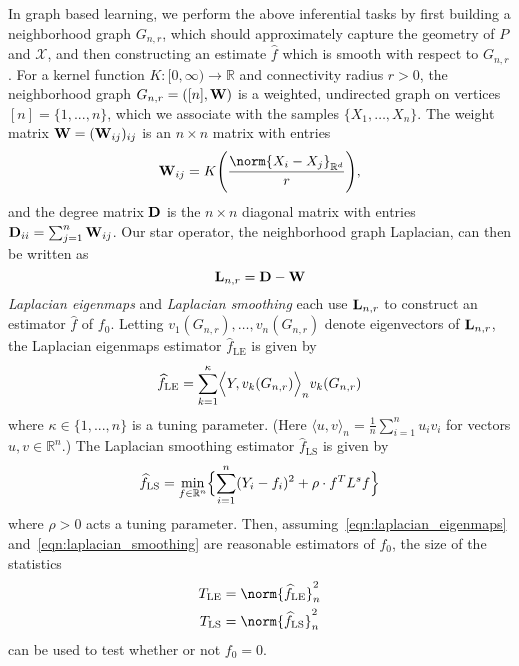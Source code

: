 \documentclass{article}
\newcommand{\Reals}{\mathbb{R}}
\newcommand{\1}{\mathbf{1}}
\newcommand{\Rd}{\Reals^d}
\newcommand{\Lap}{{\bf L}}
\newcommand{\mc}[1]{\mathcal{#1}}
\newcommand{\dotp}[2]{\langle #1, #2 \rangle}
\newcommand{\Dotp}[2]{\Bigl\langle #1, #2 \Bigr\rangle}
\newcommand{\wh}[1]{\widehat{#1}}
\newcommand{\LE}{\mathrm{LE}}
\newcommand{\LS}{\mathrm{LS}}
\theoremstyle{alden}
\theoremstyle{aldenthm}
\theoremstyle{definition}
\theoremstyle{remark}
\begin{document}
In graph based learning, we perform the above inferential tasks by first building a neighborhood graph $G_{n,r}$, which should approximately capture the geometry of $P$ and $\mc{X}$, and then constructing an estimate $\wh{f}$ which is smooth with respect to $G_{n,r}$. For a kernel function $K: [0,\infty) \to \Reals$ and connectivity radius $r > 0$, the neighborhood graph $G_{n,r} = ([n],{\bf W})$ is a weighted, undirected graph on vertices $[n] = \{1,...,n\}$, which we associate with the samples $\{X_1,\ldots,X_n\}$. The weight matrix ${\bf W} = ({\bf W}_{ij})_{ij}$ is an $n \times n$ matrix with entries
\begin{equation*}
\label{eqn:neighborhood_graph}
{\bf W}_{ij} = K\Biggl(\frac{\norm{X_i - X_j}_{\Rd}}{r}\Biggr),
\end{equation*}
and the degree matrix ${\bf D}$ is the $n \times n$ diagonal matrix with entries ${\bf D}_{ii} = \sum_{j = 1}^{n}{\bf W}_{ij}$.  Our star operator, the neighborhood graph Laplacian, can then be written as
\begin{equation}
\label{eqn:graph_Laplacian}
\Lap_{n,r} = \bf{D} - \bf{W}
\end{equation}
\emph{Laplacian eigenmaps} and \emph{Laplacian smoothing} each use $\Lap_{n,r}$ to construct an estimator $\wh{f}$ of $f_0$. Letting $v_1(G_{n,r}),\ldots,v_n(G_{n,r})$ denote eigenvectors of $\Lap_{n,r}$, the Laplacian eigenmaps estimator $\wh{f}_{\LE}$ \citep{belkin2003} is given by 
\begin{equation}
\label{eqn:laplacian_eigenmaps}
\wh{f}_{\textrm{LE}} = \sum_{k = 1}^{\kappa} \Dotp{Y}{v_k(G_{n,r})}_n v_{k}(G_{n,r})
\end{equation}
where $\kappa \in \{1,...,n\}$ is a tuning parameter. (Here $\dotp{u}{v}_n = \frac{1}{n}\sum_{i = 1}^{n} u_i v_i$ for vectors $u,v \in \Reals^n$.) The Laplacian smoothing estimator $\wh{f}_{\LS}$ \citep{smola2003} is given by
\begin{equation}
\label{eqn:laplacian_smoothing}
\wh{f}_{\LS}= \min_{f \in \Reals^n} \Bigl\{\sum_{i = 1}^{n}(Y_i - f_i)^2 + \rho \cdot f^T L^s f \Bigr\}
\end{equation}
where $\rho > 0$ acts a tuning parameter. Then, assuming~\eqref{eqn:laplacian_eigenmaps} and~\eqref{eqn:laplacian_smoothing} are reasonable estimators of $f_0$, the size of the statistics
\begin{align}
T_{\LE} & = \norm{\wh{f}_{\LE}}_n^2 \label{eqn:laplacian_eigenmaps_test}\\
T_{\LS} & = \norm{\wh{f}_{\LS}}_n^2 \label{eqn:laplacian_smoothing_test}
\end{align}
can be used to test whether or not $f_0 = 0$.
\end{document}
